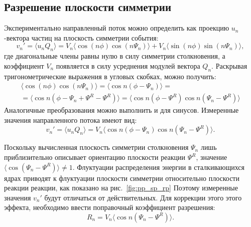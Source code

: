 \subsection{Разрешение плоскости симметрии}

Экспериментально направленный поток можно определить как проекцию $u_n$-вектора частиц на плоскость симметрии события:
%
\begin{equation}
    v_n' =  \langle u_n Q_n \rangle = 
    V_n \langle \cos (n\phi) \cos (n\Psi_n) \rangle + V_n \langle \sin(n\phi) \sin(n\Psi_n) \rangle,
\end{equation}
%
где диагональные члены равны нулю в силу симметрии столкновения, а коэффициент $V_n$ появляется в силу усреднения модулей вектора $Q_n$.
Раскрывая тригонометрические выражения в угловых скобках, можно получить:
%
\begin{equation}
\begin{align}
    \langle \cos (n\phi) \cos (n\Psi_n) \rangle = \langle \cos n ( \phi - \Psi_n ) \rangle = \\
    = \langle \cos n ( \phi - \Psi_n + \Psi^R - \Psi^R ) \rangle =
    \langle \cos n ( \phi - \Psi^R ) \cos n (\Psi_n - \Psi^R ) \rangle
\end{align}
\end{equation}
%
Аналогичные преобразования можно выполнить и для синусов. 
Измеренные значения направленного потока имеют вид:
%
\begin{equation}
    v_n' =  \langle u_n Q_n \rangle = 
    V_n \langle \cos n ( \phi - \Psi_n ) \cos n (\Psi_n - \Psi^R) \rangle.
    \label{eq:uq_transformation}
\end{equation}
%

Поскольку вычисленная плоскость симметрии столкновения $\Psi_n$ лишь приблизительно описывает ориентацию плоскости реакции $\Psi^R$, значение $ \langle \cos(\Psi_n - \Psi^R) \rangle \ne 1 $.
Флуктуации распределения энергии в сталкивающихся ядрах приводят к флуктуации плоскости симметрии относительно плоскости реакции реакции, как показано на рис.~\ref{fig:pp_sp_rp}
Поэтому измеренные значения $v_n'$ будут отличаться от действительных.
Для коррекции этого этого эффекта, необходимо ввести поправочный коэффициент разрешения:
%
\begin{equation}
    R_n = V_n \langle \cos n (\Psi_n - \Psi^R) \rangle.
\end{equation}
%

